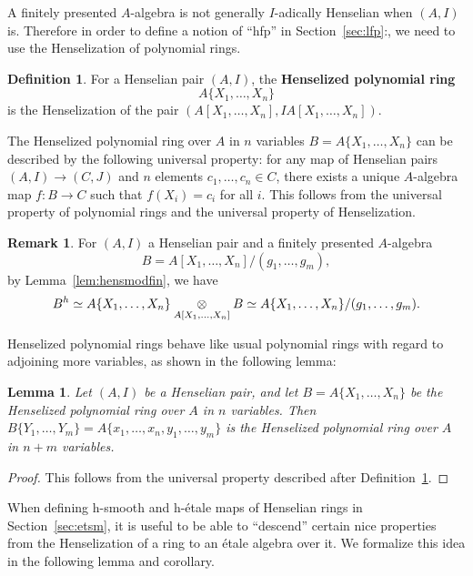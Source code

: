 \documentclass[12pt]{article}
\newcommand{\Et}{\'etale\xspace}
\newcommand{\hfp}{hfp\xspace}
\newcommand{\hetale}{h-\'etale\xspace}
\newcommand{\hsmooth}{h-smooth\xspace}
\newtheorem{lemma}[theorem]{Lemma}
\theoremstyle{definition}
\newtheorem{definition}[theorem]{Definition}
\newtheorem{remark}[theorem]{Remark}
\numberwithin{equation}{subsection}
\begin{document}
A finitely presented $A$-algebra is not generally $I$-adically Henselian when $(A,I)$ is. Therefore in order to define a notion of ``\hfp'' in Section~\ref{sec:lfp}:, we need to use the Henselization of polynomial rings.

\begin{definition}\label{def:henspoly}
For a Henselian pair $(A,I)$, the {\bf Henselized polynomial ring} $$A\{X_1,\dots,X_n\}$$ is the Henselization of the pair $(A[X_1,\dots,X_n],IA[X_1,\dots,X_n])$.

The Henselized polynomial ring over $A$ in $n$ variables $B=A\{X_1,\dots,X_n\}$ can be described by the following universal property: for any map of Henselian pairs $(A,I) \to (C,J)$ and $n$ elements $c_1,\dots,c_n \in C$, there exists a unique $A$-algebra map $f: B \to C$ such that $f(X_i)=c_i$ for all $i$. This follows from the universal property of polynomial rings and the universal property of Henselization.
 \end{definition}

\begin{remark}\label{rmk:hfpex}
For $(A,I)$ a Henselian pair and a finitely presented $A$-algebra $$B = A[X_1,\dots,X_n]/(g_1,\dots,g_m),$$ by Lemma~\ref{lem:hensmodfin}, we have $$B^h \simeq A\{X_1,\dots,X_n\} \tens_{A[X_1,\dots,X_n]} B \simeq A\{X_1,\dots,X_n\}/(g_1,\dots,g_m).$$
\end{remark}

Henselized polynomial rings behave like usual polynomial rings with regard to adjoining more variables, as shown in the following lemma:

\begin{lemma}\label{lem:polyonpoly} Let $(A,I)$ be a Henselian pair, and let $B=A\{X_1,\dots,X_n\}$ be the Henselized polynomial ring over $A$ in $n$ variables. Then $B\{Y_1,\dots,Y_m\}= A\{x_1,\dots,x_n,y_1,\dots,y_m\}$ is the Henselized polynomial ring over $A$ in $n+m$ variables. 
\end{lemma}
\begin{proof} This follows from the universal property described after Definition~\ref{def:henspoly}.\end{proof}



When defining \hsmooth and \hetale maps of Henselian rings in Section~\ref{sec:etsm}, it is useful to be able to ``descend'' certain nice properties from the Henselization of a ring to an \Et algebra over it. We formalize this idea in the following lemma and corollary.
\end{document}
